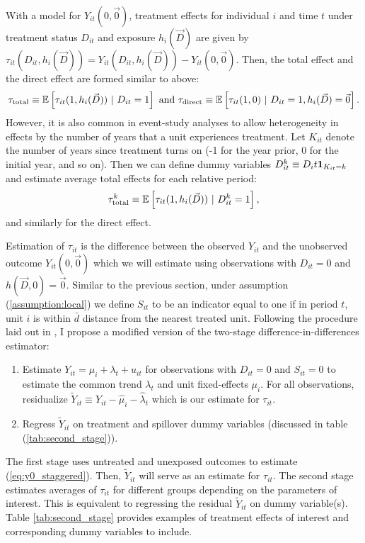 \documentclass[11pt]{article}
\begin{document}
With a model for $Y_{it}(0, \vec{0})$, treatment effects for individual $i$ and time $t$ under treatment status $D_{it}$ and exposure $h_i(\vec{D})$ are given by $\tau_{it}(D_{it}, h_i(\vec{D})) = Y_{it}(D_{it}, h_i(\vec{D})) - Y_{it}(0, \vec{0})$. Then, the total effect and the direct effect are formed similar to above:
\[
    \tau_{\text{total}} \equiv \mathbb{E}\left[ \tau_{it}(1, h_i(\vec{D})) \ \vert \ D_{it} = 1\right] \text{ and }
    \tau_{\text{direct}} \equiv \mathbb{E}\left[ \tau_{it}(1, 0) \ \vert \ D_{it} = 1, h_i(\vec{D}) = \vec{0}\right].
\]
However, it is also common in event-study analyses to allow heterogeneity in effects by the number of years that a unit experiences treatment. Let $K_{it}$ denote the number of years since treatment turns on (-1 for the year prior, 0 for the initial year, and so on). Then we can define dummy variables $D_{it}^k \equiv D_it \mathbf{1}_{K_{it} = k}$ and estimate average total effects for each relative period: 
\[
    \tau_{\text{total}}^k \equiv \mathbb{E}\left[ \tau_{it}(1, h_i(\vec{D})) \ \vert \ D_{it}^k = 1\right],
\]
and similarly for the direct effect.

Estimation of $\tau_{it}$ is the difference between the observed $Y_{it}$ and the unobserved outcome $Y_{it}(0, \vec{0})$ which we will estimate using observations with $D_{it} = 0$ and $h(\vec{D}, 0) = \vec{0}$. Similar to the previous section, under assumption (\ref{assumption:local}) we define $S_{it}$ to be an indicator equal to one if in period $t$, unit $i$ is within $\bar{d}$ distance from the nearest treated unit. Following the procedure laid out in \citet{Gardner_2021}, I propose a modified version of the two-stage difference-in-differences estimator: 

\begin{enumerate}
    \item Estimate $Y_{it} = \mu_i + \lambda_t + u_{it}$ for observations with $D_{it} = 0$ and $S_{it} = 0$ to estimate the common trend $\lambda_t$ and unit fixed-effects $\mu_i$. For all observations, residualize $\tilde{Y}_{it} \equiv Y_{it} - \hat{\mu}_i - \hat{\lambda}_t$ which is our estimate for $\tau_{it}$.
    
    \item Regress $\tilde{Y}_{it}$ on treatment and spillover dummy variables (discussed in table (\ref{tab:second_stage})).
\end{enumerate}

The first stage uses untreated and unexposed outcomes to estimate (\ref{eq:y0_staggered}). Then, $\tilde{Y}_{it}$ will serve as an estimate for $\tau_{it}$. The second stage estimates averages of $\tau_{it}$ for different groups depending on the parameters of interest. This is equivalent to regressing the residual $\tilde{Y}_{it}$ on dummy variable(s). Table \ref{tab:second_stage} provides examples of treatment effects of interest and corresponding dummy variables to include. 
\end{document}
